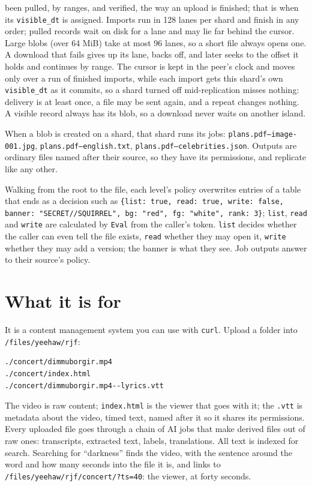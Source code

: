 \documentclass[11pt,oneside]{book}
\begin{document}
\begin{description}
  been pulled, by ranges, and verified, the way an upload is finished; that is when
  its \texttt{visible\_dt} is assigned. Imports run in 128 lanes per shard and
  finish in any order; pulled records wait on disk for a lane and may lie far
  behind the cursor. Large blobs (over 64 MiB) take at most 96 lanes, so a short file always
  opens one. A download that fails gives up its lane, backs off, and later
  seeks to the offset it holds and continues by range. The cursor is kept in the peer's clock and moves only
  over a run of finished imports, while each import gets this shard's own
  \texttt{visible\_dt} as it commits,
  so a shard turned off mid-replication misses nothing: delivery is at least once,
  a file may be sent again, and a repeat changes nothing. A visible
  record always has its blob, so a download never waits on another island.
\item[Jobs make files.] When a blob is created on a shard, that shard runs its
  jobs: \texttt{plans.pdf--image-001.jpg}, \texttt{plans.pdf--english.txt},
  \texttt{plans.pdf--celebrities.json}. Outputs are ordinary files named after
  their source, so they have its permissions, and replicate like any other.
\item[Policy.] Walking from the root to the file, each level's policy
  overwrites entries of a table that ends as a decision such as
  \texttt{\{list: true, read: true, write: false, banner: "SECRET//SQUIRREL",
  bg: "red", fg: "white", rank: 3\}}; \texttt{list}, \texttt{read} and \texttt{write} are
  calculated by \texttt{Eval} from the caller's token. \texttt{list} decides
  whether the caller can even tell the file exists, \texttt{read} whether they may
  open it, \texttt{write} whether they may add a version; the banner is what they
  see. Job outputs answer to their source's policy.
\end{description}

\section{What it is for}
It is a content management system you can use with \texttt{curl}. Upload a
folder into \texttt{/files/yeehaw/rjf}:
\begin{Verbatim}[fontsize=\small]
./concert/dimmuborgir.mp4
./concert/index.html
./concert/dimmuborgir.mp4--lyrics.vtt
\end{Verbatim}
The video is raw content; \texttt{index.html} is the viewer that goes with it; the
\texttt{.vtt} is metadata about the video, timed text, named after it so it
shares its permissions. Every uploaded file goes through a chain of AI jobs that
make derived files out of raw ones: transcripts, extracted text, labels,
translations. All text is indexed for search. Searching for ``darkness'' finds
the video, with the sentence around the word and how many seconds into the file
it is, and links to \texttt{/files/yeehaw/rjf/concert/?ts=40}: the viewer, at
forty seconds.
\end{document}

